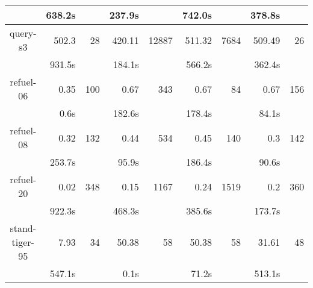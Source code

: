 \documentclass{article}
\begin{document}
\begin{table}
\begin{tabular}{|c|rr|rr|rr|rr|}
 & 638.2s & & 237.9s & & 742.0s & & 378.8s & \\
\hline
query-s3 & 502.3 & 28 & 420.11 & 12887 & 511.32 & 7684 & 509.49 & 26 \\
 & 931.5s & & 184.1s & & 566.2s & & 362.4s & \\
\hline
refuel-06 & 0.35 & 100 & 0.67 & 343 & 0.67 & 84 & 0.67 & 156 \\
 & 0.6s & & 182.6s & & 178.4s & & 84.1s & \\
\hline
refuel-08 & 0.32 & 132 & 0.44 & 534 & 0.45 & 140 & 0.3 & 142 \\
 & 253.7s & & 95.9s & & 186.4s & & 90.6s & \\
\hline
refuel-20 & 0.02 & 348 & 0.15 & 1167 & 0.24 & 1519 & 0.2 & 360 \\
 & 922.3s & & 468.3s & & 385.6s & & 173.7s & \\
\hline
stand-tiger-95 & 7.93 & 34 & 50.38 & 58 & 50.38 & 58 & 31.61 & 48 \\
 & 547.1s & & 0.1s & & 71.2s & & 513.1s & \\
\hline
\end{tabular}
\end{table}
\end{document}
